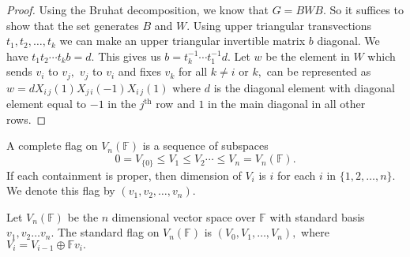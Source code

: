 \begin{proof}
Using the Bruhat decomposition, we know that $G = BWB.$ So it suffices
to show that the set generates $B$ and $W.$ Using upper triangular transvections $t_1, t_2, \dotsc, t_k$ we can make an upper triangular invertible matrix $b$ diagonal. We have $t_1 t_2 \cdots t_k b = d.$ This gives us $b = t_k^{-1} \cdots t_1^{-1} d.$ 
Let $w$ be the element in $W$ which sends $v_i$ to $v_j,$ $v_j$ to $v_i$ and fixes $v_k$ for all $k \not = i$ or $k,$ can be represented as
$w = d X_{i\,j}(1) X_{j\,i}(-1) X_{i\,j}(1)$
where $d$ is the diagonal element with diagonal element equal to $-1$ in the $j^\text{th}$ row and $1$ in the main diagonal in all other rows.
\end{proof}


\begin{definition}
	A complete flag on $V_n(\mathbb{F})$ is a sequence of subspaces
	$$0 = V_{\{0\}} \leq V_1 \leq V_2 \cdots \leq V_n = V_n(\mathbb{F}).$$
	If each containment is proper, then dimension of $V_i$ is $i$ for each $i$ in $\{1, 2, \dotsc, n\}.$ We denote this flag by $(v_1, v_2, \dotsc, v_n).$
\end{definition}
Let $V_n(\mathbb{F})$ be the $n$ dimensional vector space over $\mathbb{F}$ with standard basis $v_1, v_2 \dotsc v_n.$
The standard flag on $V_n(\mathbb{F})$ is $(V_0, V_1, \dotsc, V_n),$ where
$V_i = V_{i-1} \oplus \mathbb{F} v_i.$

